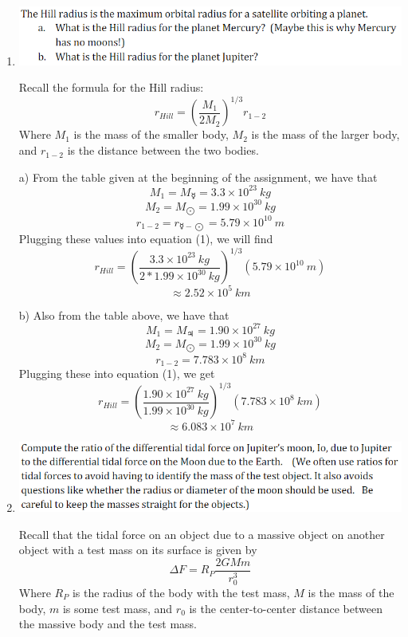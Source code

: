 \documentclass{article}
\begin{document}
\begin{enumerate}
    \item \includegraphics[scale = 0.85]{probset5prob1.PNG}
    
    Recall the formula for the Hill radius:
    \begin{equation}
        r_{Hill} = (\frac{M_{1}}{2M_{2}})^{1/3}r_{1-2}
    \end{equation}
    Where $M_1$ is the mass of the smaller body, $M_2$ is the mass of the larger body, and $r_{1-2}$ is the distance between the two bodies. 
    
    a) From the table given at the beginning of the assignment, we have that 
    \[M_1 = M_{\mercury} = 3.3 \times 10^{23} \:kg\]
    \[M_2 = M_{\bigodot} = 1.99 \times 10^{30} \:kg\]
    \[r_{1-2} = r_{\mercury - \bigodot} = 5.79 \times 10^{10} \:m\]
    Plugging these values into equation (1), we will find
    \[r_{Hill} = (\frac{3.3 \times 10^{23} \:kg}{2*1.99 \times 10^{30} \: kg})^{1/3}(5.79 \times 10^{10} \:m)\]
    \[ \approx 2.52 \times 10^5 \: km\]
    
    b) Also from the table above, we have that 
    \[M_1 = M_{\jupiter} = 1.90 \times 10^{27} \:kg\]
    \[M_2 = M_{\bigodot} = 1.99 \times 10^{30} \:kg\]
    \[r_{1-2} = 7.783 \times 10^8 \:km\]
    Plugging these into equation (1), we get 
    \[r_{Hill} = (\frac{1.90 \times 10^{27} \: kg}{1.99 \times 10^{30} \:kg})^{1/3}(7.783 \times 10^8 \:km)\]
    \[\approx 6.083 \times 10^7 \:km\]
    
    \item \includegraphics[scale = 0.85]{probset5prob2.PNG}

    Recall that the tidal force on an object due to a massive object on another object with a test mass on its surface is given by
    \begin{equation}
        \Delta F = R_{P}\frac{2GMm}{r_0^3}
    \end{equation}
    Where $R_{P}$ is the radius of the body with the test mass, $M$ is the mass of the body, $m$ is some test mass, and $r_0$ is the center-to-center distance between the massive body and the test mass.
    

\end{enumerate}
\end{document}
